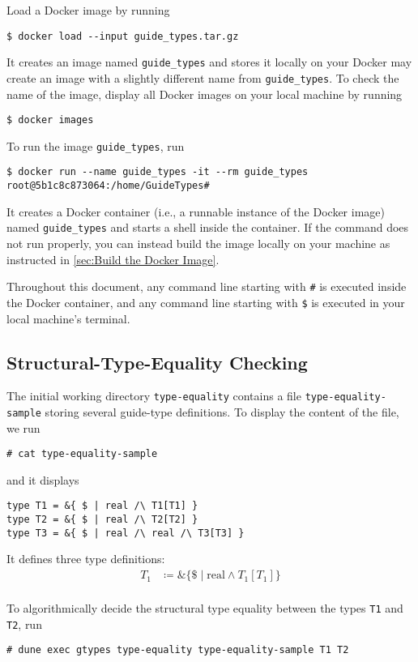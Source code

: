 Load a Docker image by running
\begin{verbatim}
$ docker load --input guide_types.tar.gz
\end{verbatim}
%
It creates an image named \texttt{guide\_types} and stores it locally on your
%
Docker may create an image with a slightly different name from
\texttt{guide\_types}.
%
To check the name of the image, display all Docker images on your local machine
by running
\begin{verbatim}
$ docker images
\end{verbatim}

To run the image \texttt{guide\_types}, run
\begin{verbatim}
$ docker run --name guide_types -it --rm guide_types
root@5b1c8c873064:/home/GuideTypes#
\end{verbatim}
%
It creates a Docker container (i.e., a runnable instance of the Docker image)
named \texttt{guide\_types} and starts a shell inside the container.
%
If the command does not run properly, you can instead build the image locally on
your machine as instructed in \cref{sec:Build the Docker Image}.

Throughout this document, any command line starting with \texttt{\#} is executed
inside the Docker container, and any command line starting with \texttt{\$} is
executed in your local machine's terminal.

\subsection{Structural-Type-Equality Checking}

The initial working directory \texttt{type-equality} contains a file
\texttt{type-equality-sample} storing several guide-type definitions.
%
To display the content of the file, we run
\begin{verbatim}
# cat type-equality-sample
\end{verbatim}
and it displays
\begin{verbatim}
type T1 = &{ $ | real /\ T1[T1] }
type T2 = &{ $ | real /\ T2[T2] }
type T3 = &{ $ | real /\ real /\ T3[T3] }
\end{verbatim}
%
It defines three type definitions:
\begin{align*}
  T_1 & \coloneq \&\{ \$ \mid \text{real} \land T_1[T_1] \} \\
\end{align*}

To algorithmically decide the structural type equality between the types \texttt{T1} and \texttt{T2}, run
\begin{verbatim}
# dune exec gtypes type-equality type-equality-sample T1 T2
\end{verbatim}
